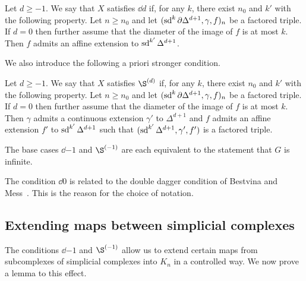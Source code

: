 \documentclass[a4paper]{article}
\begin{document}
\begin{definition}
  Let $d\geq -1$. We say that $X$ satisfies $\dd{d}$ if, for any $k$, there
  exist $n_0$ and $k'$ with the following property. Let $n\geq n_0$ and let
  $(\operatorname{sd}^k\partial\Delta^{d+1}, \gamma, f)_n$ be a factored triple. If $d = 0$
  then further assume that the diameter of the image of $f$ is at most $k$.
  Then $f$ admits an affine extension to $\operatorname{sd}^{k'}\Delta^{d+1}$.
\end{definition}

We also introduce the following a priori stronger condition.

\begin{definition}
  Let $d\geq -1$. We say that $X$ satisfies $\Sd{d}$ if, for any $k$, there
  exist $n_0$ and $k'$ with the following property. Let $n\geq n_0$ and let
  $(\operatorname{sd}^k\partial\Delta^{d+1}, \gamma, f)_n$ be a factored triple. If $d = 0$
  then further assume that the diameter of the image of $f$ is at most $k$.
  Then $\gamma$ admits a continuous extension $\gamma'$ to $\Delta^{d+1}$ and
  $f$ admits an affine extension $f'$ to $\operatorname{sd}^{k'}\Delta^{d+1}$ such that
  $(\operatorname{sd}^{k'}\Delta^{d+1}, \gamma', f')$ is a factored triple.
\end{definition}

\begin{remark}
  The base cases $\dd{-1}$ and $\Sd{-1}$ are each equivalent to the statement
  that $G$ is infinite.
\end{remark}

\begin{remark}
  The condition $\dd{0}$ is related to the double dagger condition of 
  Bestvina and Mess~\cite{bestvinamess91}. This is the reason for the choice 
  of notation.
\end{remark}

\subsection{Extending maps between simplicial complexes}

The conditions $\dd{-1}$ and $\Sd{-1}$ allow us to extend certain maps from
subcomplexes of simplicial complexes into $K_n$ in a controlled way. We now
prove a lemma to this effect.
\end{document}

